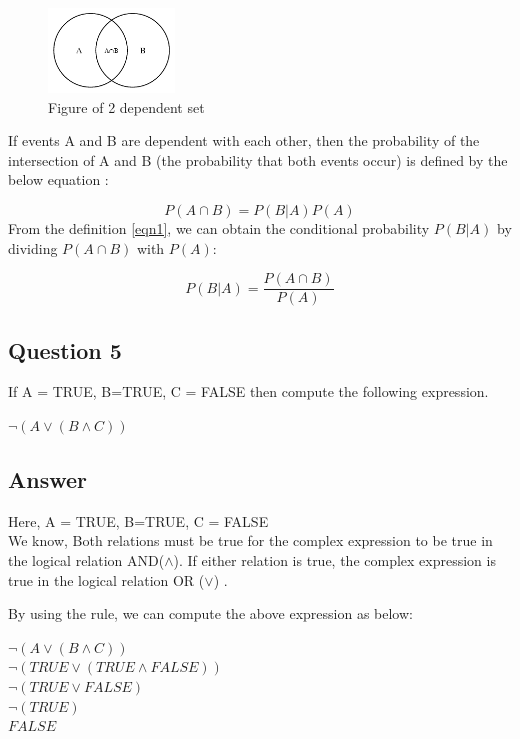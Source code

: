 \documentclass[12]{article}
\begin{document}
\begin{figure}[h]
\centering
\includegraphics[width=0.3\textwidth]{images/venntwo.png}
\caption{Figure of 2 dependent set \cite{1}}
\end{figure}

If events A and B are dependent with each other, then the probability of the intersection of A and B (the probability that both events occur) is defined by the below equation \cite{2}:

\begin{equation}
P(A \cap B)=P(B|A)P(A) 
\label{eqn1}
\end{equation}
From the definition \ref{eqn1}, we can obtain the conditional probability $P(B|A)$  by dividing $P(A \cap B)$ with $P(A)$:

\begin{equation}
P(B|A)=\frac{P(A \cap B)}{P(A)}
\label{eqn2}
\end{equation}
 

\subsection*{Question 5}
 If A = TRUE, B=TRUE, C = FALSE then compute the following expression.\\
\begin{center}
   $\neg ( A \vee (B \land C) ) $ 
\end{center} 
\subsection*{Answer}
Here, A = TRUE, B=TRUE, C = FALSE \\
We know, Both relations must be true for the complex expression to be true in the logical relation AND($\land$).
If either relation is true, the complex expression is true in the logical relation OR ($\vee$) \cite{3}.

By using the rule, we can compute the above expression as below:\\
\begin{center}
$\neg ( A \vee (B \land C) ) $ \\
\implies $\neg ( TRUE \vee (TRUE \land FALSE )) $ \\
     \implies $\neg (TRUE \vee  FALSE)  $ \\
     \implies$\neg (TRUE)  $ \\
     \implies $FALSE$
      
     
\end{center}
\end{document}
